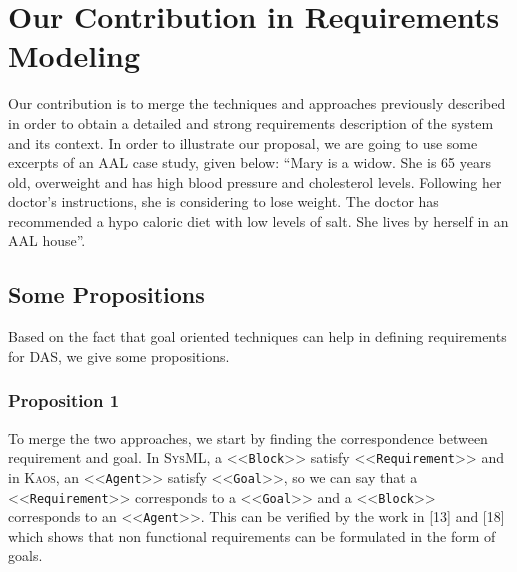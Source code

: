 \documentclass[10pt, conference, compsocconf]{IEEEtran}
\def\sysml{\textsc{SysML}}
\def\kaos{\textsc{Kaos}}
\newcommand{\Myfig}[1]{Figure~\ref{fig:#1}}
\newcommand{\stereotype}[1]{\textless\textless\texttt{#1}\textgreater\textgreater}
\begin{document}



\section{Our Contribution in Requirements Modeling}\label{sec:contrib}

Our contribution is to merge the techniques and approaches previously described in order
to obtain a detailed and strong requirements description of the system and its context.
In order to illustrate our proposal, we are going to use some excerpts of an AAL case study, given below: 
``Mary is a widow. She is 65 years old, overweight and has high blood pressure and cholesterol levels. Following her doctor's instructions, she is considering to lose weight. The doctor has recommended a hypo caloric diet with low levels of salt. She lives by herself in an AAL house''.

\subsection{Some Propositions}



Based on the fact that goal oriented techniques can help in defining requirements for DAS, we give some propositions.

\subsubsection*{Proposition 1}

To merge the two approaches, we start by finding the correspondence between requirement and goal. In \sysml{}, a \stereotype{Block} satisfy \stereotype{Requirement} and in \kaos{}, an \stereotype{Agent} satisfy \stereotype{Goal}, so we can say that a \stereotype{Requirement} corresponds to a \stereotype{Goal} and a \stereotype{Block} corresponds to an \stereotype{Agent}. This can be verified by the work in [13] and [18] which shows that non functional requirements can be formulated in the form of goals. 
\end{document}
